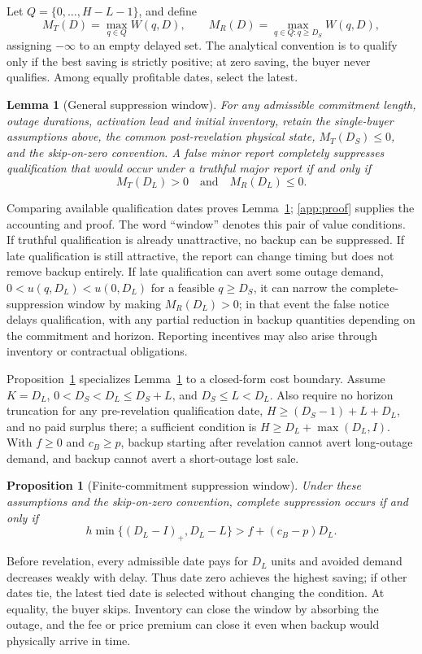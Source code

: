 \documentclass[preprint,11pt,authoryear]{elsarticle}
\newtheorem{lemma}{Lemma}
\newtheorem{proposition}{Proposition}
\begin{document}
Let $Q=\{0,\ldots,H-L-1\}$, and define
\begin{equation}
 M_T(D)=\max_{q\in Q}W(q,D),\qquad
 M_R(D)=\max_{q\in Q:q\ge D_S}W(q,D),\label{eq:maxima}
\end{equation}
assigning $-\infty$ to an empty delayed set. The analytical convention is to qualify only if the best saving is strictly positive; at zero saving, the buyer never qualifies. Among equally profitable dates, select the latest.

\begin{lemma}[General suppression window]\label{prop:general_window}
For any admissible commitment length, outage durations, activation lead and initial inventory, retain the single-buyer assumptions above, the common post-revelation physical state, $M_T(D_S)\le0$, and the skip-on-zero convention. A false minor report completely suppresses qualification that would occur under a truthful major report if and only if
\begin{equation}
 M_T(D_L)>0\quad\text{and}\quad M_R(D_L)\le0.\label{eq:window}
\end{equation}
\end{lemma}
Comparing available qualification dates proves Lemma~\ref{prop:general_window}; \ref{app:proof} supplies the accounting and proof. The word ``window'' denotes this pair of value conditions. If truthful qualification is already unattractive, no backup can be suppressed. If late qualification is still attractive, the report can change timing but does not remove backup entirely. If late qualification can avert some outage demand, $0<u(q,D_L)<u(0,D_L)$ for a feasible $q\ge D_S$, it can narrow the complete-suppression window by making $M_R(D_L)>0$; in that event the false notice delays qualification, with any partial reduction in backup quantities depending on the commitment and horizon. Reporting incentives may also arise through inventory or contractual obligations.

Proposition~\ref{prop:r1} specializes Lemma~\ref{prop:general_window} to a closed-form cost boundary. Assume $K=D_L$, $0<D_S<D_L\le D_S+L$, and $D_S\le L<D_L$. Also require no horizon truncation for any pre-revelation qualification date, $H\ge(D_S-1)+L+D_L$, and no paid surplus there; a sufficient condition is $H\ge D_L+\max(D_L,I)$. With $f\ge0$ and $c_B\ge p$, backup starting after revelation cannot avert long-outage demand, and backup cannot avert a short-outage lost sale.
\begin{proposition}[Finite-commitment suppression window]\label{prop:r1}
Under these assumptions and the skip-on-zero convention, complete suppression occurs if and only if
\begin{equation}
 h\min\{(D_L-I)_+,D_L-L\}>f+(c_B-p)D_L.\label{eq:r1}
\end{equation}
\end{proposition}
Before revelation, every admissible date pays for $D_L$ units and avoided demand decreases weakly with delay. Thus date zero achieves the highest saving; if other dates tie, the latest tied date is selected without changing the condition. At equality, the buyer skips. Inventory can close the window by absorbing the outage, and the fee or price premium can close it even when backup would physically arrive in time.
\end{document}
